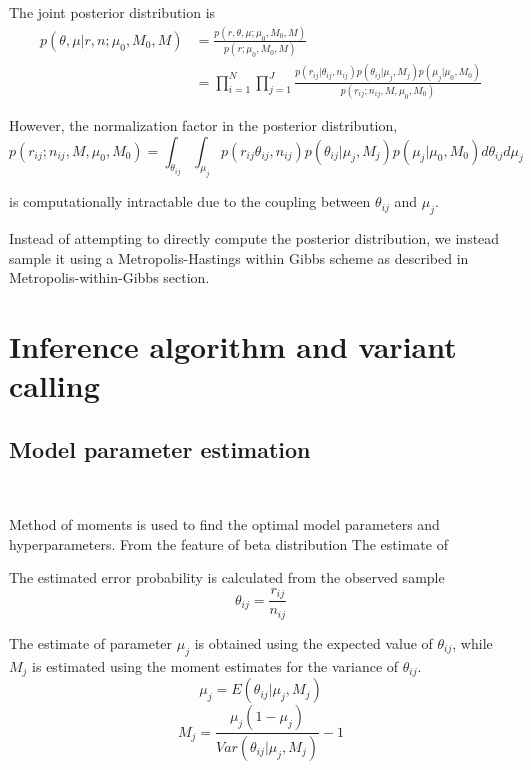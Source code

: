 \documentclass[11pt,reqno]{amsart}
\begin{document}
The joint posterior distribution is
\begin{equation}
\begin{split}
 p(\theta, \mu | r,n; \mu_0,M_0,M) &= \frac{p(r,\theta,\mu;\mu_0,M_0,M)}{p(r;\mu_0,M_0,M)}\\
 & = \prod_{i=1}^N\prod_{j=1}^J\frac{p(r_{ij}|\theta_{ij},n_{ij})p(\theta_{ij}|\mu_j,M_j)p(\mu_j|\mu_0,M_0)}{p(r_{ij};n_{ij},M,\mu_0,M_0)}
\end{split} 
\end{equation}

However, the normalization factor in the posterior distribution,
\begin{equation}
 {p(r_{ij};n_{ij},M,\mu_0,M_0)}=\int_{\theta_{ij}}\int_{\mu_j}p(r_{ij}\theta_{ij},n_{ij})p(\theta_{ij}|\mu_j,M_j)p(\mu_j|\mu_0,M_0)d\theta_{ij}d\mu_j
\end{equation}

is computationally intractable due to the coupling between $\theta_{ij}$ and $\mu_j$.

Instead of attempting to directly compute the posterior distribution, we instead sample it using a Metropolis-Hastings within Gibbs scheme as described in Metropolis-within-Gibbs section.

\section{Inference algorithm and variant calling}
\subsection{Model parameter estimation}\

Method of moments is used to find the optimal model parameters and hyperparameters. From the feature of beta distribution
The estimate of 

The estimated error probability is calculated from the observed sample
\begin{equation}
 \theta_{ij}=\frac{r_{ij}}{n_{ij}}
\end{equation}

The estimate of parameter $\mu_j$ is obtained using the expected value of $\theta_{ij}$, while $M_j$ is estimated using the moment estimates for the variance of $\theta_{ij}$.
\begin{equation}
 \mu_j=E(\theta_{ij}|\mu_j,M_j)
\end{equation}
\begin{equation}
 M_j=\frac{\mu_j(1-\mu_j)}{Var(\theta_{ij}|\mu_j,M_j)}-1
\end{equation}
\end{document}
